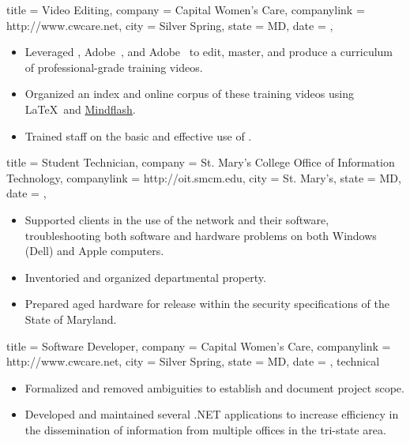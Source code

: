 \documentclass[
textout=\jobname.cv.txt,
textout preamble = preamble.txt,
]{bettercv}
\begin{document}
\begin{position}
  {
    title   = Video Editing,
    company = Capital Women's Care,
    companylink = http://www.cwcare.net,
    city    = Silver Spring,
    state   = MD,
    date    = ,
  }

\begin{itemize}
\item Leveraged ,
  Adobe~, and
  Adobe~ to edit, master, and produce
    a curriculum of professional-grade training videos.
  \item Organized an index and online corpus of these training videos
    using \LaTeX\ and \href{http://www.mindflash.com}{Mindflash}.
\item Trained staff on the basic and effective use of .
\end{itemize}
\end{position}

\begin{position}
  {
    title   = Student Technician,
    company = St. Mary's College \Dash Office of Information Technology,
    companylink = http://oit.smcm.edu,
    city    = St. Mary's,
    state   = MD,
    date    = ,
  }

\begin{itemize}
\item Supported clients in the use of the network and their software,
  troubleshooting both software and hardware problems on both Windows (Dell) and Apple computers.
\item Inventoried and organized departmental property.
\item Prepared aged hardware for release within the security specifications of the State of Maryland.
\end{itemize}
\end{position}

\begin{position}
  {
    title   = Software Developer,
    company = Capital Women's Care,
    companylink = http://www.cwcare.net,
    city    = Silver Spring,
    state   = MD,
    date    = ,
    technical
  }

\begin{itemize}
\item Formalized and removed ambiguities to establish and document project scope.
\item Developed and maintained several .NET applications to increase efficiency
  in the dissemination of information from multiple offices in the tri-state area.
\end{itemize}
\end{position}
\end{document}
